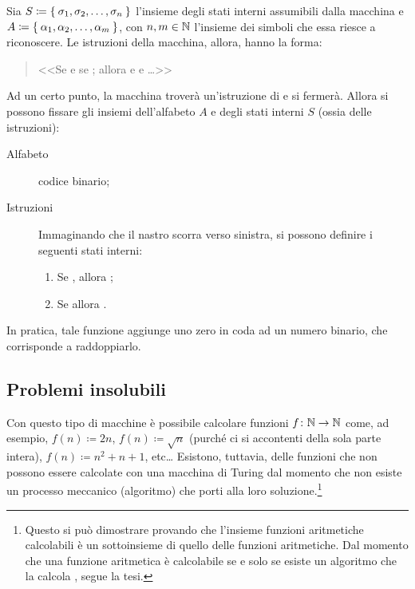 Sia $S\coloneqq \Set{\sigma_1,\sigma_2,\dots,\sigma_n}$ l'insieme degli stati interni assumibili dalla macchina e $A\coloneqq\Set{\alpha_1,\alpha_2,\dots,\alpha_m}$, con $n,m\in\mathbb{N}$ l'insieme dei simboli che essa riesce a riconoscere.
Le istruzioni della macchina, allora, hanno la forma:
\begin{quote}
<<Se  e se ; allora  e  e \dots>>
\end{quote}
Ad un certo punto, la macchina troverà un'istruzione di  e si fermerà.
Allora si possono fissare gli insiemi dell'alfabeto $A$ e degli stati interni $S$ (ossia delle istruzioni):
\begin{description}
	\item[Alfabeto] codice binario;
	\item[Istruzioni] Immaginando che il nastro scorra verso sinistra, si possono definire i seguenti stati interni:
		\begin{enumerate}
			\item
Se , allora ;
			\item
Se  allora .
		\end{enumerate}
\end{description}
In pratica, tale funzione aggiunge uno zero in coda ad un numero binario, che corrisponde a raddoppiarlo.

		\subsection{Problemi insolubili}
		\label{subsec:ins}

Con questo tipo di macchine è possibile calcolare funzioni $f\colon\mathbb{N}\to\mathbb{N}$ come, ad esempio, $f(n)\coloneqq2n$, $f(n)\coloneqq\sqrt{n}$ (purché ci si accontenti della sola parte intera), $f(n)\coloneqq n^2+n+1$, etc\dots{}
Esistono, tuttavia, delle funzioni che non possono essere calcolate con una macchina di Turing dal momento che non esiste un processo meccanico (algoritmo) che porti alla loro soluzione.\footnote{Questo si può dimostrare provando che l'insieme funzioni aritmetiche calcolabili è un sottoinsieme di quello delle funzioni aritmetiche.
Dal momento che una funzione aritmetica è calcolabile se e solo se esiste un algoritmo che la calcola \cite{fp:comp}, segue la tesi.}

